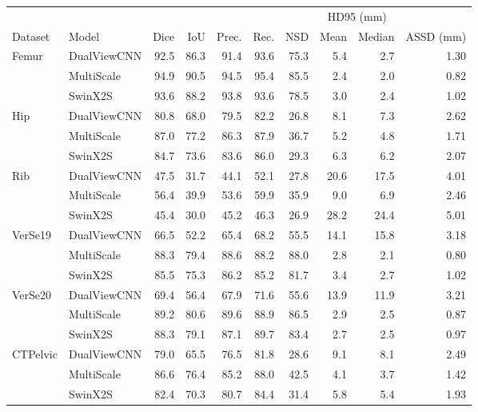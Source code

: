 \begin{tabular}{llrrrrrrrr}
\toprule
&&&&&&& \multicolumn{2}{c}{HD95 (mm)} & \\ \cmidrule(lr){8-9} Dataset & Model & Dice & IoU & Prec. & Rec. & NSD & Mean & Median & ASSD (mm) \\
\midrule
Femur & DualViewCNN & 92.5 & 86.3 & 91.4 & 93.6 & 75.3 & 5.4 & 2.7 & 1.30 \\
 & MultiScale & 94.9 & 90.5 & 94.5 & 95.4 & 85.5 & 2.4 & 2.0 & 0.82 \\
 & SwinX2S & 93.6 & 88.2 & 93.8 & 93.6 & 78.5 & 3.0 & 2.4 & 1.02 \\
Hip & DualViewCNN & 80.8 & 68.0 & 79.5 & 82.2 & 26.8 & 8.1 & 7.3 & 2.62 \\
 & MultiScale & 87.0 & 77.2 & 86.3 & 87.9 & 36.7 & 5.2 & 4.8 & 1.71 \\
 & SwinX2S & 84.7 & 73.6 & 83.6 & 86.0 & 29.3 & 6.3 & 6.2 & 2.07 \\
Rib & DualViewCNN & 47.5 & 31.7 & 44.1 & 52.1 & 27.8 & 20.6 & 17.5 & 4.01 \\
 & MultiScale & 56.4 & 39.9 & 53.6 & 59.9 & 35.9 & 9.0 & 6.9 & 2.46 \\
 & SwinX2S & 45.4 & 30.0 & 45.2 & 46.3 & 26.9 & 28.2 & 24.4 & 5.01 \\
VerSe19 & DualViewCNN & 66.5 & 52.2 & 65.4 & 68.2 & 55.5 & 14.1 & 15.8 & 3.18 \\
 & MultiScale & 88.3 & 79.4 & 88.6 & 88.2 & 88.0 & 2.8 & 2.1 & 0.80 \\
 & SwinX2S & 85.5 & 75.3 & 86.2 & 85.2 & 81.7 & 3.4 & 2.7 & 1.02 \\
VerSe20 & DualViewCNN & 69.4 & 56.4 & 67.9 & 71.6 & 55.6 & 13.9 & 11.9 & 3.21 \\
 & MultiScale & 89.2 & 80.6 & 89.6 & 88.9 & 86.5 & 2.9 & 2.5 & 0.87 \\
 & SwinX2S & 88.3 & 79.1 & 87.1 & 89.7 & 83.4 & 2.7 & 2.5 & 0.97 \\
CTPelvic & DualViewCNN & 79.0 & 65.5 & 76.5 & 81.8 & 28.6 & 9.1 & 8.1 & 2.49 \\
 & MultiScale & 86.6 & 76.4 & 85.2 & 88.0 & 42.5 & 4.1 & 3.7 & 1.42 \\
 & SwinX2S & 82.4 & 70.3 & 80.7 & 84.4 & 31.4 & 5.8 & 5.4 & 1.93 \\
\bottomrule
\end{tabular}
